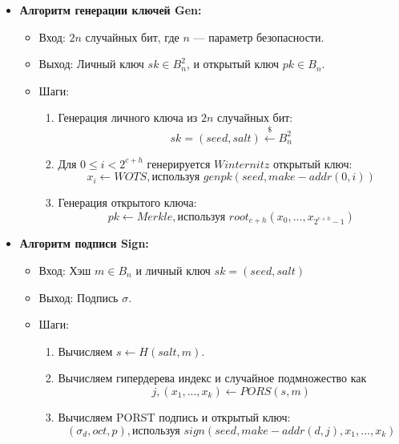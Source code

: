 \documentclass[a4paper, 14pt]{extarticle}
\begin{document}
\begin{itemize}
    \item \textbf{Алгоритм генерации ключей Gen:}

    \begin{itemize}
        \item Вход: $2n$ случайных бит, где $n$ --- параметр безопасности.
        \item Выход: Личный ключ $sk \in B^{2}_{n}$, и открытый ключ $pk \in B_{n}$.
        \item Шаги:

        \begin{enumerate}
            \item Генерация личного ключа из $2n$ случайных бит:
            \[sk = (seed, salt) \stackrel{\$}{\leftarrow} B^{2}_{n}\]
    
            \item Для $0 \leq i < 2^{c+h}$ генерируется $Winternitz$ открытый ключ:
            \[x_{i} \leftarrow WOTS, \text{используя } genpk(seed, make-addr(0, i))\]
    
            \item Генерация открытого ключа:
            \[pk \leftarrow Merkle, \text{используя } root_{c+h}(x_{0}, ..., x_{2^{c+h} - 1})\]
        \end{enumerate}
    \end{itemize}

    \item \textbf{Алгоритм подписи Sign:}

    \begin{itemize}
        \item Вход: Хэш $m \in B_{n}$ и личный ключ $sk = (seed, salt)$
        \item Выход: Подпись $\sigma$.
        \item Шаги:

        \begin{enumerate}
            \item Вычисляем $s \leftarrow H(salt, m)$.
    
            \item Вычисляем гипердерева индекс и случайное подмножество как
            \[j, (x_{1}, ..., x_{k}) \leftarrow PORS(s, m)\]
    
            \item Вычисляем PORST подпись и открытый ключ:
            \[(\sigma_{d}, oct, p), \text{используя } sign(seed, make-addr(d, j), x_{1}, ..., x_{k})\]
    

\end{enumerate}
\end{itemize}
\end{itemize}
\end{document}
